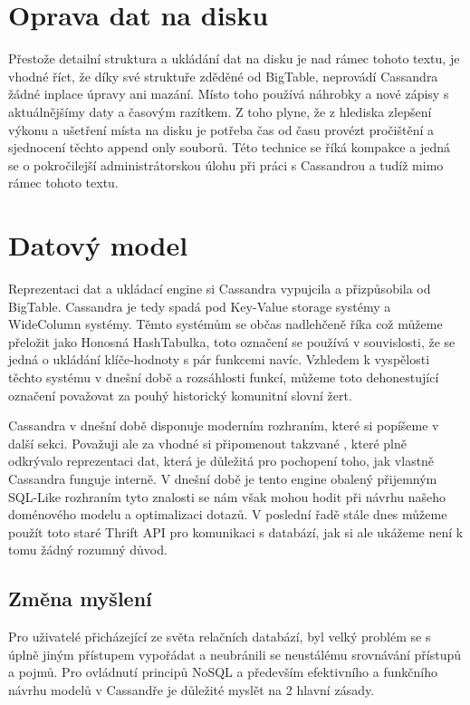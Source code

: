 \section{Oprava dat na disku}
Přestože detailní struktura a ukládání dat na disku je nad rámec tohoto textu, je vhodné říct, že díky své struktuře zděděné od BigTable, neprovádí Cassandra žádné inplace úpravy ani mazání. Místo toho používá náhrobky a nové zápisy s aktuálnějšímy daty a časovým razítkem. Z toho plyne, že z hlediska zlepšení výkonu a ušetření místa na disku je potřeba čas od času provézt pročištění a sjednocení těchto append only souborů. Této technice se říká kompakce a jedná se o pokročilejší administrátorskou úlohu při práci s Cassandrou a tudíž mimo rámec tohoto textu. 

\section{Datový model}
Reprezentaci dat a ukládací engine si Cassandra vypujcila a přizpůsobila od BigTable. Cassandra je tedy spadá pod Key-Value storage systémy a WideColumn systémy. Těmto systémům se občas nadlehčeně říka  což můžeme přeložit jako Honosná HashTabulka, toto označení se používá v souvislosti, že se jedná  o ukládání klíče-hodnoty s pár funkcemi navíc. Vzhledem k vyspělosti těchto systému v dnešní době a rozsáhlosti funkcí, můžeme toto dehonestující označení považovat za pouhý historický komunitní slovní žert.

Cassandra v dnešní době disponuje moderním rozhraním, které si popíšeme v další sekci. Považuji ale za vhodné si připomenout takzvané , které plně odkrývalo reprezentaci dat, která je důležitá pro pochopení toho, jak vlastně Cassandra funguje interně. V dnešní době je tento engine obalený přijemným SQL-Like rozhraním tyto znalosti se nám však mohou hodit při návrhu našeho doménového modelu a optimalizaci dotazů. V poslední řadě stále dnes můžeme použít toto staré Thrift API pro komunikaci s databází, jak si ale ukážeme není k tomu žádný rozumný důvod. 

\subsection{Změna myšlení}
Pro uživatelé přicházející ze světa relačních databází, byl velký problém se s úplně jiným přístupem vypořádat a neubránili se neustálému srovnávání přístupů a pojmů. Pro ovládnutí principů NoSQL a především efektivního a funkčního návrhu modelů v Cassandře je důležité myslět na 2 hlavní zásady. 

